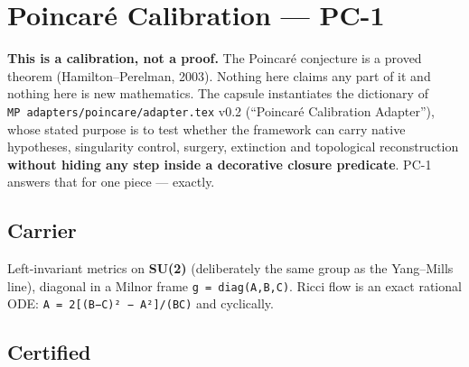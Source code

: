 \hypertarget{poincaruxe9-calibration-pc-1}{%
\chapter{Poincaré Calibration --- PC-1}\label{poincaruxe9-calibration-pc-1}}

\textbf{This is a calibration, not a proof.} The Poincaré conjecture is a proved
theorem (Hamilton--Perelman, 2003). Nothing here claims any part of it and
nothing here is new mathematics. The capsule instantiates the dictionary of
\texttt{MP\ adapters/poincare/adapter.tex} v0.2 (``Poincaré Calibration Adapter''),
whose stated purpose is to test whether the framework can carry native
hypotheses, singularity control, surgery, extinction and topological
reconstruction \textbf{without hiding any step inside a decorative closure
predicate}. PC-1 answers that for one piece --- exactly.

\hypertarget{carrier}{%
\section{Carrier}\label{carrier}}

Left-invariant metrics on \textbf{SU(2)} (deliberately the same group as the
Yang--Mills line), diagonal in a Milnor frame \texttt{g\ =\ diag(A,B,C)}. Ricci flow
is an exact rational ODE: \texttt{A\textquotesingle{}\ =\ 2{[}(B−C)²\ −\ A²{]}/(BC)} and cyclically.

\hypertarget{certified}{%
\section{Certified}\label{certified}}

